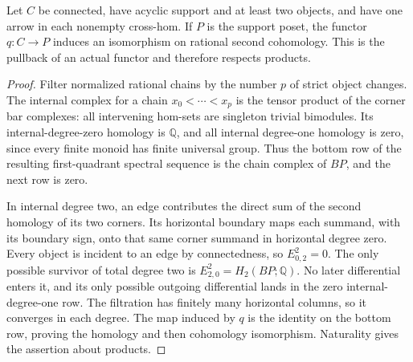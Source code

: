 \begin{lemma}
\label{CP2:A-singleton-support}
Let $C$ be connected, have acyclic support and at least two objects,
and have one arrow in each nonempty cross-hom. If $P$ is the
support poset, the functor $q:C\to P$ induces an isomorphism on
rational second cohomology. This is the pullback of an actual
functor and therefore respects products.
\end{lemma}
\begin{proof}
Filter normalized rational chains by the number $p$ of strict
object changes. The internal complex for a chain
$x_0<\cdots<x_p$ is the tensor product of the corner bar complexes:
all intervening hom-sets are singleton trivial bimodules. Its
internal-degree-zero homology is $\mathbb Q$, and all internal
degree-one homology is zero, since every finite monoid has finite
universal group. Thus the bottom row of the resulting first-quadrant
spectral sequence is the chain complex of $BP$, and the next row
is zero.

In internal degree two, an edge contributes the direct sum of the
second homology of its two corners. Its horizontal boundary maps
each summand, with its boundary sign, onto that same corner
summand in horizontal degree zero. Every object is incident to
an edge by connectedness, so $E^2_{0,2}=0$. The only possible
survivor of total degree two is $E^2_{2,0}=H_2(BP;\mathbb Q)$.
No later differential enters it, and its only possible outgoing
differential lands in the zero internal-degree-one row.
The filtration has finitely many horizontal columns, so it
converges in each degree. The map induced by $q$ is the identity
on the bottom row, proving the homology and then cohomology
isomorphism. Naturality gives the assertion about products.
\end{proof}

